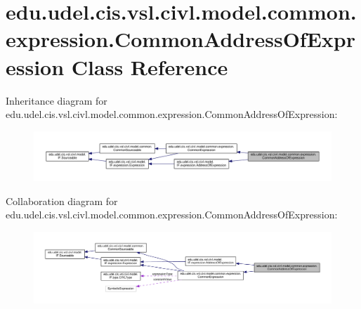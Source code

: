 \hypertarget{classedu_1_1udel_1_1cis_1_1vsl_1_1civl_1_1model_1_1common_1_1expression_1_1CommonAddressOfExpression}{}\section{edu.\+udel.\+cis.\+vsl.\+civl.\+model.\+common.\+expression.\+Common\+Address\+Of\+Expression Class Reference}
\label{classedu_1_1udel_1_1cis_1_1vsl_1_1civl_1_1model_1_1common_1_1expression_1_1CommonAddressOfExpression}


Inheritance diagram for edu.\+udel.\+cis.\+vsl.\+civl.\+model.\+common.\+expression.\+Common\+Address\+Of\+Expression\+:
\nopagebreak
\begin{figure}[H]
\begin{center}
\leavevmode
\includegraphics[width=350pt]{classedu_1_1udel_1_1cis_1_1vsl_1_1civl_1_1model_1_1common_1_1expression_1_1CommonAddressOfExpression__inherit__graph}
\end{center}
\end{figure}


Collaboration diagram for edu.\+udel.\+cis.\+vsl.\+civl.\+model.\+common.\+expression.\+Common\+Address\+Of\+Expression\+:
\nopagebreak
\begin{figure}[H]
\begin{center}
\leavevmode
\includegraphics[width=350pt]{classedu_1_1udel_1_1cis_1_1vsl_1_1civl_1_1model_1_1common_1_1expression_1_1CommonAddressOfExpression__coll__graph}
\end{center}
\end{figure}
